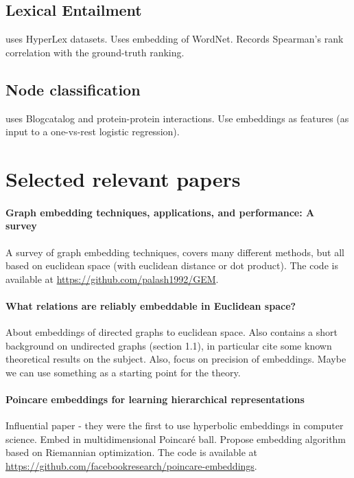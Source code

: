 \documentclass{article}
\begin{document}
 
\subsection{Lexical Entailment}

\cite{nickel2017poincare} uses HyperLex datasets. Uses embedding of WordNet. Records Spearman’s rank correlation
with the ground-truth ranking. 

\subsection{Node classification}

\cite{goyal2018graph} uses Blogcatalog and protein-protein interactions. Use embeddings as features (as input to a one-vs-rest logistic regression).

\section{Selected relevant papers}

\paragraph{Graph embedding techniques, applications, and performance: A survey~\cite{goyal2018graph}}

A survey of graph embedding techniques, covers many different methods, but all based on euclidean space (with euclidean distance or dot product). The code is available at \url{https://github.com/palash1992/GEM}.

\paragraph{What relations are reliably embeddable in Euclidean space?~\cite{bhattacharjee2019relations}}

About embeddings of directed graphs to euclidean space. Also contains a short background on undirected graphs (section 1.1), in particular cite some known theoretical results on the subject. Also, focus on precision of embeddings. Maybe we can use something as a starting point for the theory. 

\paragraph{Poincare embeddings for learning hierarchical representations~\cite{nickel2017poincare}}

Influential paper - they were the first to use hyperbolic embeddings in computer science.
Embed in multidimensional Poincar{\'e} ball. Propose embedding algorithm based on Riemannian optimization. The code is available at \url{https://github.com/facebookresearch/poincare-embeddings}.
\end{document}
